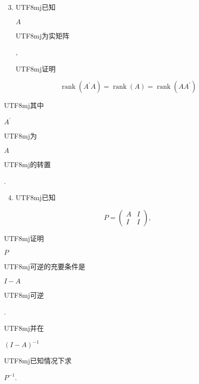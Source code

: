 \documentclass[10pt]{article}
\begin{document}
\begin{enumerate}
  \setcounter{enumi}{2}
  \item \begin{CJK}{UTF8}{mj}已知\end{CJK} $A$ \begin{CJK}{UTF8}{mj}为实矩阵\end{CJK}, \begin{CJK}{UTF8}{mj}证明\end{CJK}
\end{enumerate}
$$
\operatorname{rank}\left(A^{\prime} A\right)=\operatorname{rank}(A)=\operatorname{rank}\left(A A^{\prime}\right)
$$
\begin{CJK}{UTF8}{mj}其中\end{CJK} $A^{\prime}$ \begin{CJK}{UTF8}{mj}为\end{CJK} $A$ \begin{CJK}{UTF8}{mj}的转置\end{CJK}.

\begin{enumerate}
  \setcounter{enumi}{3}
  \item \begin{CJK}{UTF8}{mj}已知\end{CJK}
\end{enumerate}
$$
P=\left(\begin{array}{cc}
A & I \\
I & I
\end{array}\right) \text {, }
$$
\begin{CJK}{UTF8}{mj}证明\end{CJK} $P$ \begin{CJK}{UTF8}{mj}可逆的充要条件是\end{CJK} $I-A$ \begin{CJK}{UTF8}{mj}可逆\end{CJK}. \begin{CJK}{UTF8}{mj}并在\end{CJK} $(I-A)^{-1}$ \begin{CJK}{UTF8}{mj}已知情况下求\end{CJK} $P^{-1}$.
\end{document}
